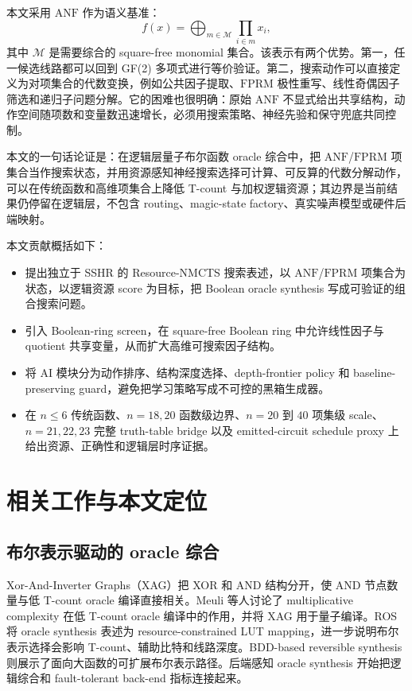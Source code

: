 \documentclass[UTF8,fontset=macnew,11pt]{ctexart}
\newcommand{\method}{Resource-NMCTS}
\newcommand{\screen}{Boolean-ring screen}
\newcommand{\anf}{\ensuremath{\mathrm{ANF}}}
\newcommand{\fprm}{\ensuremath{\mathrm{FPRM}}}
\newcommand{\ttable}{truth-table}
\begin{document}
本文采用 \anf{} 作为语义基准：
\begin{equation}
  f(x)=\bigoplus_{m\in\mathcal{M}}\prod_{i\in m}x_i ,
  \label{eq:anf}
\end{equation}
其中 $\mathcal{M}$ 是需要综合的 square-free monomial 集合。该表示有两个优势。第一，任一候选线路都可以回到 GF(2) 多项式进行等价验证。第二，搜索动作可以直接定义为对项集合的代数变换，例如公共因子提取、\fprm{} 极性重写、线性奇偶因子筛选和递归子问题分解。它的困难也很明确：原始 \anf{} 不显式给出共享结构，动作空间随项数和变量数迅速增长，必须用搜索策略、神经先验和保守兜底共同控制。

本文的一句话论证是：在逻辑层量子布尔函数 oracle 综合中，把 \anf{}/\fprm{} 项集合当作搜索状态，并用资源感知神经搜索选择可计算、可反算的代数分解动作，可以在传统函数和高维项集合上降低 T-count 与加权逻辑资源；其边界是当前结果仍停留在逻辑层，不包含 routing、magic-state factory、真实噪声模型或硬件后端映射。

本文贡献概括如下：
\begin{itemize}
  \item 提出独立于 SSHR 的 \method{} 搜索表述，以 \anf{}/\fprm{} 项集合为状态，以逻辑资源 score 为目标，把 Boolean oracle synthesis 写成可验证的组合搜索问题。
  \item 引入 \screen{}，在 square-free Boolean ring 中允许线性因子与 quotient 共享变量，从而扩大高维可搜索因子结构。
  \item 将 AI 模块分为动作排序、结构深度选择、depth-frontier policy 和 baseline-preserving guard，避免把学习策略写成不可控的黑箱生成器。
  \item 在 $n\leq6$ 传统函数、$n=18,20$ 函数级边界、$n=20$ 到 $40$ 项集级 scale、$n=21,22,23$ 完整 \ttable{} bridge 以及 emitted-circuit schedule proxy 上给出资源、正确性和逻辑层时序证据。
\end{itemize}

\section{相关工作与本文定位}

\subsection{布尔表示驱动的 oracle 综合}

Xor-And-Inverter Graphs（XAG）把 XOR 和 AND 结构分开，使 AND 节点数量与低 T-count oracle 编译直接相关。Meuli 等人讨论了 multiplicative complexity 在低 T-count oracle 编译中的作用\cite{meuli2019multiplicative}，并将 XAG 用于量子编译\cite{meuli2022xag}。ROS 将 oracle synthesis 表述为 resource-constrained LUT mapping\cite{meuli2020ros}，进一步说明布尔表示选择会影响 T-count、辅助比特和线路深度。BDD-based reversible synthesis 则展示了面向大函数的可扩展布尔表示路径\cite{wille2009bdd}。后端感知 oracle synthesis 开始把逻辑综合和 fault-tolerant back-end 指标连接起来\cite{yu2025backend}。
\end{document}
